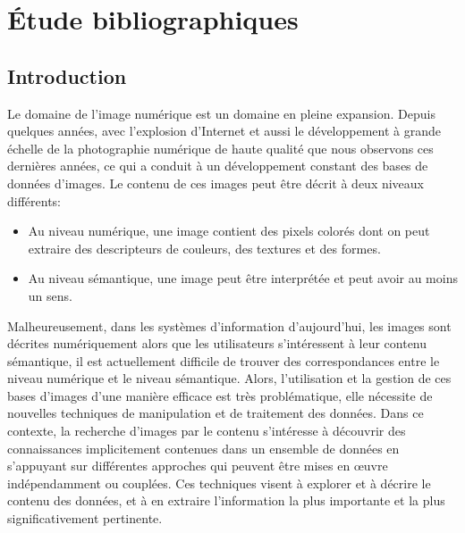 
\chapter{Étude bibliographiques} %

\label{ChapterX} %


\section{Introduction}
Le domaine de l’image numérique est un domaine en pleine expansion. Depuis quelques années, avec l’explosion d’Internet et aussi le développement à grande échelle de la photographie
numérique de haute qualité que nous observons ces dernières années, ce
qui a conduit à un développement constant des bases de données d’images. Le contenu de ces images peut être décrit à deux niveaux différents: 
\begin{itemize}
	\item Au niveau numérique, une image contient des pixels colorés dont on peut extraire des descripteurs de couleurs, des textures et des formes. 
	\item Au niveau sémantique, une image peut être interprétée et peut avoir au moins un sens. 
\end{itemize}

Malheureusement, dans les systèmes d'information d'aujourd'hui, les images sont décrites numériquement alors que les utilisateurs s'intéressent à leur contenu sémantique, il est actuellement difficile de trouver des correspondances entre le niveau numérique et le niveau sémantique. Alors, l’utilisation et la
gestion de ces bases d’images d’une manière efficace est très problématique, elle nécessite de nouvelles techniques de manipulation et de traitement des données. Dans ce contexte, la recherche d’images par le contenu s’intéresse à découvrir des connaissances implicitement contenues dans un ensemble de données en s’appuyant sur différentes approches qui peuvent être mises en œuvre
indépendamment ou couplées. Ces techniques visent à explorer et à décrire le contenu des données, et à en extraire l’information la plus importante et la plus significativement pertinente.
\\

